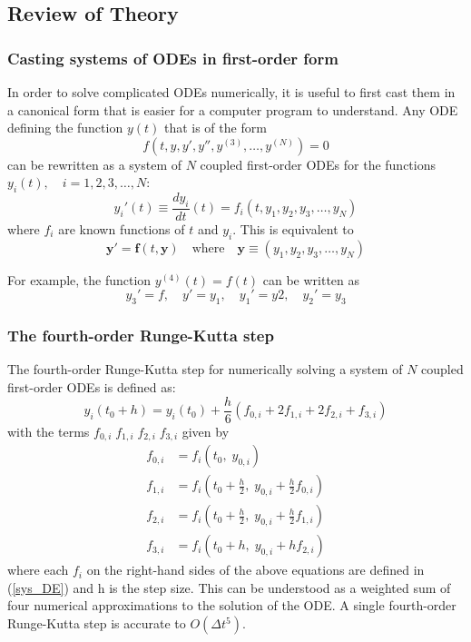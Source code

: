 \documentclass[10pt]{article}
\begin{document}
\subsection*{Review of Theory}

\subsubsection*{Casting systems of ODEs in first-order form}

In order to solve complicated ODEs numerically, it is useful to first cast them in a canonical form that 
is easier for a computer program to understand. Any ODE defining the function $y(t)$ that is of the form 
$$f(t, y, y', y'', y^{(3)}, \ldots,  y^{(N)}) = 0$$
can be rewritten as a system of $N$ coupled first-order ODEs for the functions 
$y_i(t), \quad i = 1, 2, 3, \ldots, N$:
\begin{equation}\label{sys_DE}
y_i'(t) \equiv \frac{dy_i}{dt}(t) = f_i(t, y_1, y_2, y_3, \ldots, y_N)
\end{equation}
where $f_i$ are known functions of $t$ and $y_i$. This is equivalent to
\begin{equation}\label{sys_DE_vec}
\mathbf{y'} = \mathbf{f}(t, \mathbf{y}) \quad \textrm{where} \quad \mathbf{y} \equiv (y_1, y_2, y_3, 
\ldots, y_N)
\end{equation}

For example, the function $y^{(4)}(t) = f(t)$ can be written as 
$$y_3' = f, \quad y' = y_1, \quad y_1' = y2, \quad y_2' = y_3$$

\subsubsection*{The fourth-order Runge-Kutta step}

The fourth-order Runge-Kutta step for numerically solving a system of $N$ coupled first-order ODEs is 
defined as:
\begin{equation}\label{rk_step}
y_i(t_0 + h) = y_i(t_0) + \frac{h}{6} (f_{0,i} + 2f_{1,i} + 2f_{2,i} + f_{3,i})
\end{equation}
with the terms $f_{0,i} \;f_{1,i} \;f_{2,i} \;f_{3,i}$ given by 
\begin{align}\label{rk_step_f_defs}
f_{0,i} &= f_i(t_0, \;y_{0,i}) \\
f_{1,i} &= f_i\left(t_0 + \frac{h}{2}, \;y_{0,i} + \frac{h}{2} f_{0,i}\right) \\
f_{2,i} &= f_i\left(t_0 + \frac{h}{2}, \;y_{0,i} + \frac{h}{2} f_{1,i}\right) \\
f_{3,i} &= f_i\left(t_0 + h, \;y_{0,i} + h f_{2,i}\right)
\end{align}
where each $f_i$ on the right-hand sides of the above equations are defined in (\ref{sys_DE}) and 
h is the step size. This can be understood as a weighted sum of four numerical approximations to the 
solution of the ODE. A single fourth-order Runge-Kutta step is accurate to $O(\Delta t^5)$.
\end{document}
